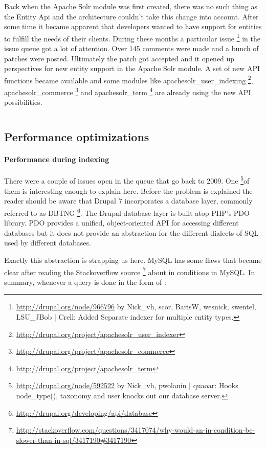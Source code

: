 Back when the Apache Solr module was first created, there was no such thing as the Entity Api and the architecture couldn't take this change into account. After some time it became apparent that developers wanted to have support for entities to fulfill the needs of their clients. During these months a particular issue \footnote{\url{http://drupal.org/node/966796}  by Nick\_vh, scor, BarisW, wesnick, swentel, LSU\_JBob | Crell: Added Separate indexer for multiple entity types.} in the issue queue got a lot of attention. Over 145 comments were made and a bunch of patches were posted. Ultimately the patch got accepted and it opened up perspectives for new entity support in the Apache Solr module. A set of new API functions became available and some modules like apachesolr\_user\_indexing \footnote{\url{http://drupal.org/project/apachesolr_user_indexer}}, apachesolr\_commerce \footnote{\url{http://drupal.org/project/apachesolr_commerce}} and apachesolr\_term \footnote{\url{http://drupal.org/project/apachesolr_term}} are already using the new API possibilities.

\inputminted[fontsize=\scriptsize,linenos]{php}{./code_examples/entity_api.php}

\subsection{Performance optimizations}
\paragraph{Performance during indexing}
There were a couple of issues open in the queue that go back to 2009. One \footnote{\url{http://drupal.org/node/592522} by Nick\_vh, pwolanin | quaoar: Hooks node\_type(), taxonomy and user knocks out our database server.}of them is interesting enough to explain here. Before the problem is explained the reader should be aware that Drupal 7 incorporates a database layer, commonly referred to as DBTNG \footnote{\url{http://drupal.org/developing/api/database}}. The Drupal database layer is built atop PHP's PDO library. PDO provides a unified, object-oriented API for accessing different databases but it does not provide an abstraction for the different dialects of SQL used by different databases.

Exactly this abstraction is strapping us here. MySQL has some flaws that became clear after reading the Stackoverflow source \footnote{\url{http://stackoverflow.com/questions/3417074/why-would-an-in-condition-be-slower-than-in-sql/3417190\#3417190}} about in conditions in MySQL. In summary, whenever a query is done in the form of :

